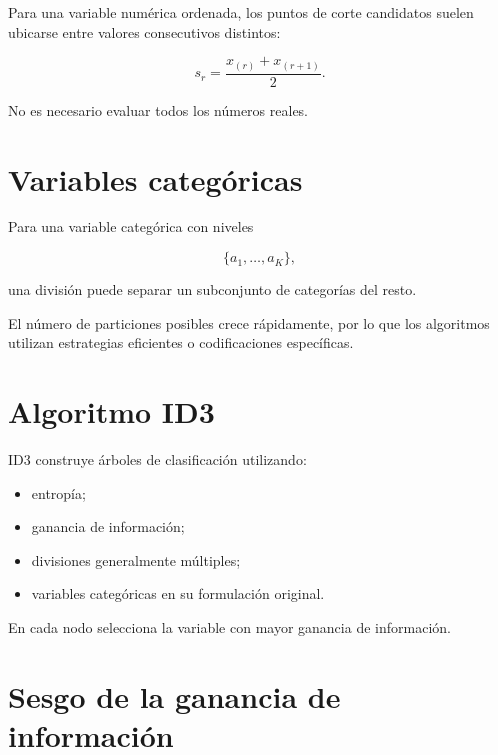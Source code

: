 \documentclass[
  spanish,
  10.5pt,
  letterpaper,
  DIV=11,
  numbers=noendperiod,
  oneside,
  open=any]{scrreprt}
\providecommand{\tightlist}{%
  \setlength{\itemsep}{0pt}\setlength{\parskip}{0pt}}
\theoremstyle{definition}
\theoremstyle{definition}
\theoremstyle{plain}
\theoremstyle{remark}
\begin{document}

Para una variable numérica ordenada, los puntos de corte candidatos
suelen ubicarse entre valores consecutivos distintos:

\[
s_r
=
\frac{x_{(r)}+x_{(r+1)}}{2}.
\]

No es necesario evaluar todos los números reales.

\section*{Variables categóricas}\label{variables-categuxf3ricas-2}


Para una variable categórica con niveles

\[
\{a_1,\ldots,a_K\},
\]

una división puede separar un subconjunto de categorías del resto.

El número de particiones posibles crece rápidamente, por lo que los
algoritmos utilizan estrategias eficientes o codificaciones específicas.

\section*{Algoritmo ID3}\label{algoritmo-id3}


ID3 construye árboles de clasificación utilizando:

\begin{itemize}
\tightlist
\item
  entropía;
\item
  ganancia de información;
\item
  divisiones generalmente múltiples;
\item
  variables categóricas en su formulación original.
\end{itemize}

En cada nodo selecciona la variable con mayor ganancia de información.

\section*{Sesgo de la ganancia de
información}\label{sesgo-de-la-ganancia-de-informaciuxf3n}
\end{document}
